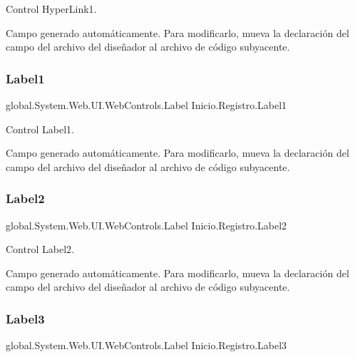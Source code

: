Control Hyper\+Link1. 

Campo generado automáticamente. Para modificarlo, mueva la declaración del campo del archivo del diseñador al archivo de código subyacente. \mbox{\label{class_inicio_1_1_registro_a4ec239a90d4abd7bfd75de6f88d318c9}} 
\subsubsection{\texorpdfstring{Label1}{Label1}}
{\footnotesize\ttfamily global.\+System.\+Web.\+U\+I.\+Web\+Controls.\+Label Inicio.\+Registro.\+Label1\hspace{0.3cm}{\ttfamily [protected]}}



Control Label1. 

Campo generado automáticamente. Para modificarlo, mueva la declaración del campo del archivo del diseñador al archivo de código subyacente. \mbox{\label{class_inicio_1_1_registro_ae7b4e658b3d377fe9acc4b4930616dae}} 
\subsubsection{\texorpdfstring{Label2}{Label2}}
{\footnotesize\ttfamily global.\+System.\+Web.\+U\+I.\+Web\+Controls.\+Label Inicio.\+Registro.\+Label2\hspace{0.3cm}{\ttfamily [protected]}}



Control Label2. 

Campo generado automáticamente. Para modificarlo, mueva la declaración del campo del archivo del diseñador al archivo de código subyacente. \mbox{\label{class_inicio_1_1_registro_ae363d31acf3834211c8e17996e39782f}} 
\subsubsection{\texorpdfstring{Label3}{Label3}}
{\footnotesize\ttfamily global.\+System.\+Web.\+U\+I.\+Web\+Controls.\+Label Inicio.\+Registro.\+Label3\hspace{0.3cm}{\ttfamily [protected]}}



